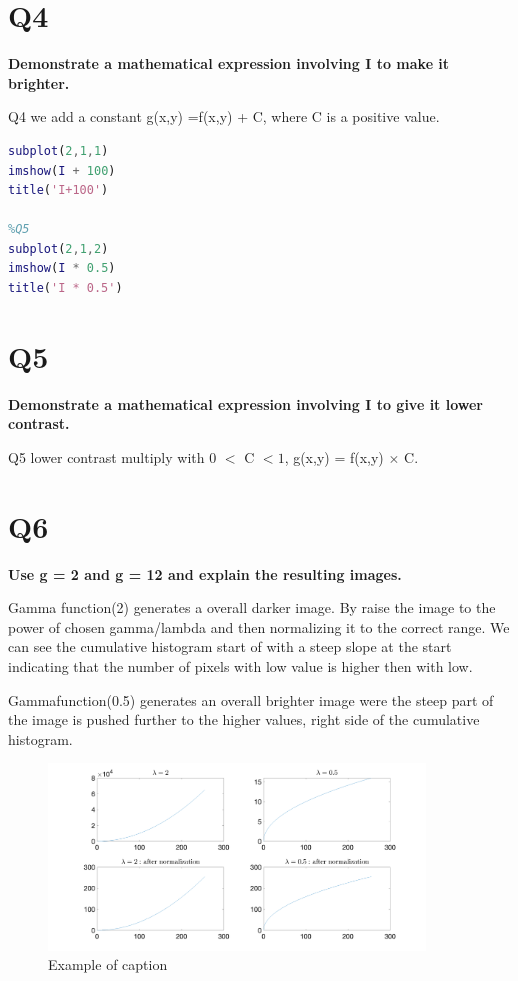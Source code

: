 \documentclass[oneside,a4paper]{article}
\begin{document}
\section*{Q4}
\textbf{Demonstrate a mathematical expression involving I to make it brighter.}

Q4 we add a constant g(x,y) =f(x,y) + C, where C is a positive value.

\begin{lstlisting}[language=MATLAB]
%Q4
subplot(2,1,1)
imshow(I + 100)
title('I+100')

%Q5
subplot(2,1,2)
imshow(I * 0.5)
title('I * 0.5')
\end{lstlisting}

\section*{Q5}
\textbf{Demonstrate a mathematical expression involving I to give it lower contrast.}

Q5 lower contrast multiply with  0 $<$ C $<1$,  g(x,y) = f(x,y) $\times$ C.


\section{Q6}
\textbf{Use g = 2 and g = 12 and explain the resulting images.}

Gamma function(2) generates a overall darker image. By raise the image to the power of chosen gamma/lambda and then normalizing it to the correct range. We can see the cumulative histogram start of with a steep slope at the start indicating that the number of pixels with low value is higher then with low. 

Gammafunction(0.5) generates an overall brighter image were the steep part of the image is pushed further to the higher values, right side of the cumulative histogram. 


\begin{figure}[ht!]
\centering
\includegraphics[width=100mm]{figures/Q6b.png}
\caption{Example of caption}
\label{fig:Q6b}
\end{figure}
\end{document}
